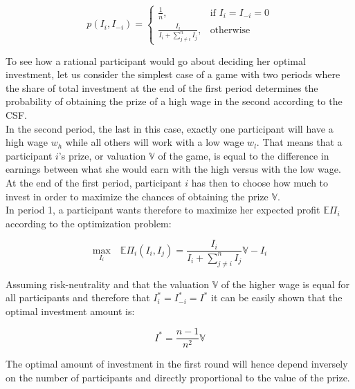 \begin{equation}
    p(I_i,I_{-i}) =
\begin{cases}
    \frac{1}{n},& \text{if } I_i = I_{-i} = 0\\
    \frac{I_i}{I_i + \sum_{j\neq i}^n I_{j}},              & \text{otherwise}
\end{cases}
\label{eq:csf}    
\end{equation}

\hfill \break

To see how a rational participant would go about deciding her optimal investment, let us consider the simplest case of a game with two periods where the share of total investment at the end of the first period determines the probability of obtaining the prize of a high wage in the second according to the CSF.\\

In the second period, the last in this case, exactly one participant will have a high wage $w_h$ while all others will work with a low wage $w_l$. That means that a participant $i$'s prize, or valuation $\mathbb{V}$ of the game, is equal to the difference in earnings between what she would earn with the high versus with the low wage. At the end of the first period, participant $i$ has then to choose how much to invest in order to maximize the chances of obtaining the prize $\mathbb{V}$.\\

In period 1, a participant wants therefore to maximize her expected profit $\mathbb{E}\Pi_i$ according to the optimization problem:

\begin{equation}
    \underset{I_i}{\text{max}}\quad\mathbb{E}\Pi_i(I_i,I_j) = \frac{I_i}{I_i + \sum_{j\neq i}^n I_{j}}\mathbb{V} - I_i
\label{eq:exp_util}
\end{equation}

Assuming risk-neutrality and that the valuation $\mathbb{V}$ of the higher wage is equal for all participants and therefore that $I_i^{*}=I_{-i}^{*}=I^{*}$ it can be easily shown that the optimal investment amount is:

\begin{equation}
    I^{*} = \frac{n-1}{n^2}\mathbb{V}
\label{eq:opt_last}
\end{equation}

\hfill \break 

The optimal amount of investment in the first round will hence depend inversely on the number of participants and directly proportional to the value of the prize.\\

